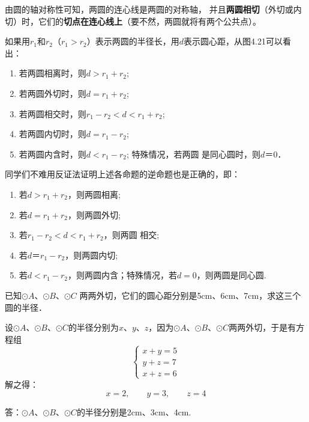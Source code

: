 由圆的轴对称性可知，两圆的连心线是两圆的对称轴，
并且\textbf{两圆相切}（外切或内切）时，它们的\textbf{切点在连心线上}（要不然，两圆就将有两个公共点）。



如果用$r_1$和$r_2$（$r_1>r_2$）表示两圆的半径长，用$d$表示圆心距，从图4.21可以看出：
\begin{enumerate}
\item 若两圆相离时，则$d>r_1+r_2$;
\item 若两圆外切时，则$d=r_1+r_2$;
\item 若两圆相交时，则$r_1-r_2<d<r_1+r_2$;
\item 若两圆内切时，则$d=r_1-r_2$;
\item 若两圆内含时，则$d<r_1-r_2$; 特殊情况，若两圆
是同心圆时，则$d＝0$．
\end{enumerate}

同学们不难用反证法证明上述各命题的逆命题也是正确的，即：
\begin{enumerate}
  \item 若$d>r_1+r_2$，则两圆相离;
\item 若$d=r_1+r_2$，则两圆外切;
\item 若$r_1-r_2<d<r_1+r_2$，则两圆
相交;
\item  若$d＝r_1-r_2$，则两圆内切;
\item 若$d<r_1-r_2$，则两圆内含；特殊情况，若$d=0$，则两圆是同心圆.
\end{enumerate}

\begin{example}
已知$\odot A$、$\odot B$、$\odot C$
  两两外切，它们的圆心距分别是5cm、6cm、7cm，求这三个圆的半径．
\end{example}

\begin{figure}[htp]
  \centering
{}
  \caption{}
\end{figure}


\begin{solution}
设$\odot A$、$\odot B$、$\odot C$的半径分别为$x$、$y$、$z$，因为$\odot A$、$\odot B$、$\odot C$两两外切，于是有方程组
\[\begin{cases}
  x+y=5\\
  y+z=7\\
  x+z=6
\end{cases}\]
解之得：
\[x=2,\qquad y=3,\qquad z=4\]

答：$\odot A$、$\odot B$、$\odot C$的半径分别是2cm、3cm、4cm.
\end{solution}


